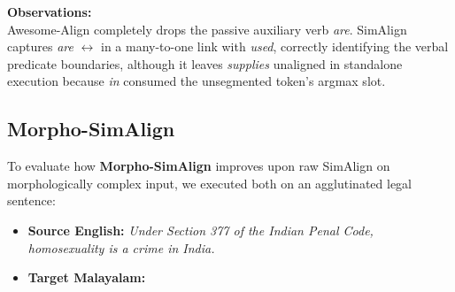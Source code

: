 \FloatBarrier

\noindent
\textbf{Observations:}\\
Awesome-Align completely drops the passive auxiliary verb \textit{are}. SimAlign captures \textit{are} $\leftrightarrow$  in a many-to-one link with \textit{used}, correctly identifying the verbal predicate boundaries, although it leaves \textit{supplies} unaligned in standalone execution because \textit{in} consumed the unsegmented token's argmax slot.

\subsection{Morpho-SimAlign}
\label{sec:morpho_simalign_eval}

To evaluate how \textbf{Morpho-SimAlign} improves upon raw SimAlign on morphologically complex input, we executed both on an agglutinated legal sentence:
\begin{itemize}[noitemsep]
    \item \textbf{Source English:} \textit{Under Section 377 of the Indian Penal Code, homosexuality is a crime in India.}
    \item \textbf{Target Malayalam:}\\
\end{itemize}



